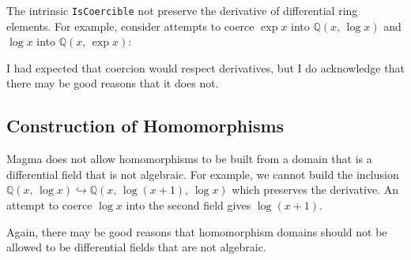 \documentclass{article}
\theoremstyle{plain}
\theoremstyle{definition}
\newcommand{\Q}{\mathbb{Q}}
\begin{document}
The intrinsic \lstinline{IsCoercible} not preserve the derivative of
differential ring elements. For example, consider attempts to coerce $\exp x$
into $\Q(x,\, \log x)$ and $\log x$ into $\Q(x,\, \exp x)$:



I had expected that coercion would respect derivatives, but I do acknowledge
that there may be good reasons that it does not.

\subsection{Construction of Homomorphisms}

Magma does not allow homomorphisms to be built from a domain that is a
differential field that is not algebraic. For example, we cannot build the
inclusion $\Q(x,\, \log x) \hookrightarrow \Q(x,\, \log(x + 1),\, \log x)$ which
preserves the derivative. An attempt to coerce $\log x$ into the second field
gives $\log(x + 1)$.



Again, there may be good reasons that homomorphism domains should not be allowed
to be differential fields that are not algebraic.



\end{document}
